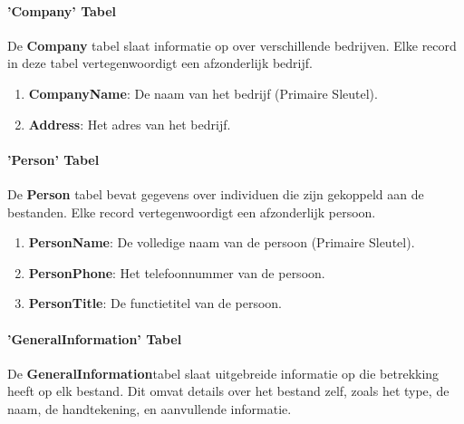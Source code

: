 \paragraph{'Company' Tabel}

De \textbf{Company} tabel slaat informatie op over verschillende bedrijven. Elke record in deze tabel vertegenwoordigt een afzonderlijk bedrijf.

\begin{enumerate}
    \item \textbf{CompanyName}: De naam van het bedrijf (Primaire Sleutel).
    \item \textbf{Address}: Het adres van het bedrijf.
\end{enumerate}

\paragraph{'Person' Tabel}

De \textbf{Person} tabel bevat gegevens over individuen die zijn gekoppeld aan de bestanden. Elke record vertegenwoordigt een afzonderlijk persoon.

\begin{enumerate}
    \item \textbf{PersonName}: De volledige naam van de persoon (Primaire Sleutel).
    \item \textbf{PersonPhone}: Het telefoonnummer van de persoon.
    \item \textbf{PersonTitle}: De functietitel van de persoon.
\end{enumerate}

\paragraph{'GeneralInformation' Tabel}

De \textbf{GeneralInformation}tabel slaat uitgebreide informatie op die betrekking heeft op elk bestand. Dit omvat details over het bestand zelf, zoals het type, de naam, de handtekening, en aanvullende informatie.


